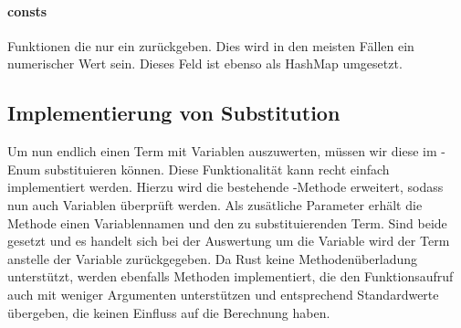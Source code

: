 \documentclass[11pt,a4paper, ngerman]{article}
\begin{document}
\paragraph{consts} Funktionen die nur ein  zurückgeben. Dies wird in den meisten Fällen ein numerischer Wert sein. Dieses Feld ist ebenso als HashMap umgesetzt.

\subsection{Implementierung von Substitution} Um nun endlich einen Term mit Variablen auszuwerten, müssen wir diese im -Enum substituieren können. Diese Funktionalität kann recht einfach implementiert werden. Hierzu wird die bestehende -Methode erweitert, sodass nun auch Variablen überprüft werden. Als zusätliche Parameter erhält die Methode einen Variablennamen und den zu substituierenden Term. Sind beide gesetzt und es handelt sich bei der Auswertung um die Variable wird der Term anstelle der Variable zurückgegeben. Da Rust keine Methodenüberladung unterstützt, werden ebenfalls Methoden implementiert, die den Funktionsaufruf auch mit weniger Argumenten unterstützen und entsprechend Standardwerte übergeben, die keinen Einfluss auf die Berechnung haben.
\end{document}
